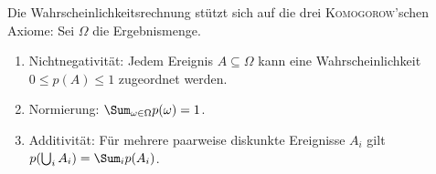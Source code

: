 Die Wahrscheinlichkeitsrechnung stützt sich auf die drei \textsc{Komogorow}'schen Axiome: Sei \(\Omega\) die Ergebnismenge.
\begin{enumerate}
	\item Nichtnegativität: Jedem Ereignis \(A \subseteq \Omega\) kann eine Wahrscheinlichkeit \(0 \leq p(A) \leq 1\) zugeordnet werden.
	\item Normierung: \(\Sum_{\omega\in\Omega} p(\omega) = 1\).
	\item Additivität: Für mehrere paarweise diskunkte Ereignisse \(A_i\) gilt \(p(\bigcup_{i} A_i) = \Sum_{i} p(A_i)\).
\end{enumerate}


